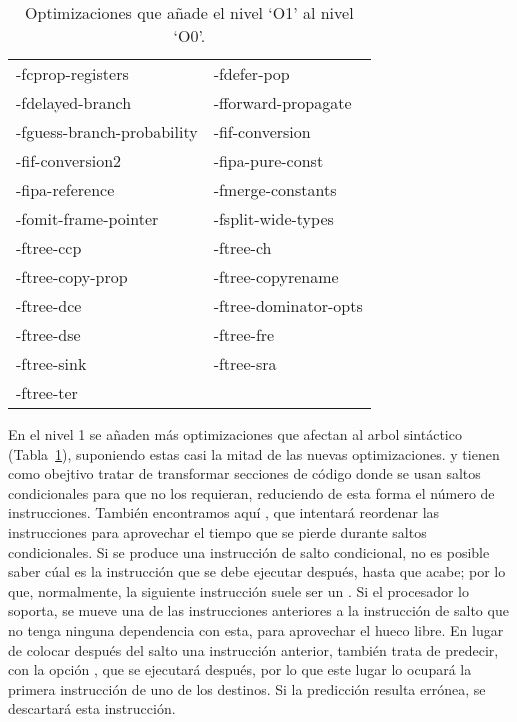 \begin{table}[htb]
\begin{center}
	\begin{tabular}{ll}
		-fcprop-registers & -fdefer-pop\\
		-fdelayed-branch & -fforward-propagate\\
		-fguess-branch-probability &-fif-conversion\\
		-fif-conversion2 & -fipa-pure-const\\
		-fipa-reference & -fmerge-constants\\
		-fomit-frame-pointer & -fsplit-wide-types\\
		-ftree-ccp & -ftree-ch\\
		-ftree-copy-prop & -ftree-copyrename\\
		-ftree-dce & -ftree-dominator-opts\\
		-ftree-dse & -ftree-fre\\
		-ftree-sink & -ftree-sra\\
		-ftree-ter & \\
	\end{tabular}
\end{center}
\caption{Optimizaciones que añade el nivel `O1' al nivel `O0'.}
\label{opt1}
\end{table}

En el nivel 1 se añaden más optimizaciones que afectan al arbol sintáctico (Tabla~\ref{opt1}), suponiendo estas casi la mitad de las nuevas optimizaciones.  y  tienen como obejtivo tratar de transformar secciones de código donde se usan saltos condicionales para que no los requieran, reduciendo de esta forma el número de instrucciones. También encontramos aquí , que intentará reordenar las instrucciones para aprovechar el tiempo que se pierde durante saltos condicionales. Si se produce una instrucción de salto condicional, no es posible saber cúal es la instrucción que se debe ejecutar después, hasta que acabe; por lo que, normalmente, la siguiente instrucción suele ser un . Si el procesador lo soporta, se mueve una de las instrucciones anteriores a la instrucción de salto que no tenga ninguna dependencia con esta, para aprovechar el hueco libre. En lugar de colocar después del salto una instrucción anterior,  también trata de predecir, con la opción , que se ejecutará después, por lo que este lugar lo ocupará la primera instrucción de uno de los destinos. Si la predicción resulta errónea, se descartará esta instrucción.


